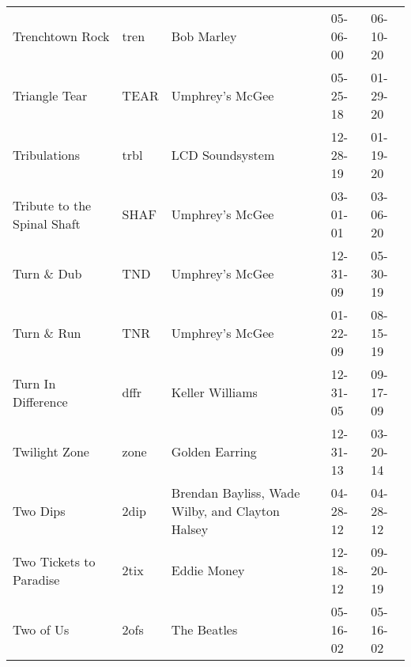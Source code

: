 \begin{longtable}{p{}p{}p{}p{}p{}}
                                                         Trenchtown Rock &          tren &                                               Bob Marley &              05-06-00 &             06-10-20 \\
                                                           Triangle Tear &          TEAR &                                          Umphrey's McGee &              05-25-18 &             01-29-20 \\
                                                            Tribulations &          trbl &                                          LCD Soundsystem &              12-28-19 &             01-19-20 \\
                                             Tribute to the Spinal Shaft &          SHAF &                                          Umphrey's McGee &              03-01-01 &             03-06-20 \\
                                                             Turn \& Dub &           TND &                                          Umphrey's McGee &              12-31-09 &             05-30-19 \\
                                                             Turn \& Run &           TNR &                                          Umphrey's McGee &              01-22-09 &             08-15-19 \\
                                                      Turn In Difference &          dffr &                                          Keller Williams &              12-31-05 &             09-17-09 \\
                                                           Twilight Zone &          zone &                                           Golden Earring &              12-31-13 &             03-20-14 \\
                                                                Two Dips &          2dip &          Brendan Bayliss, Wade Wilby, and Clayton Halsey &              04-28-12 &             04-28-12 \\
                                                 Two Tickets to Paradise &          2tix &                                              Eddie Money &              12-18-12 &             09-20-19 \\
                                                               Two of Us &          2ofs &                                              The Beatles &              05-16-02 &             05-16-02 \\

\end{longtable}
